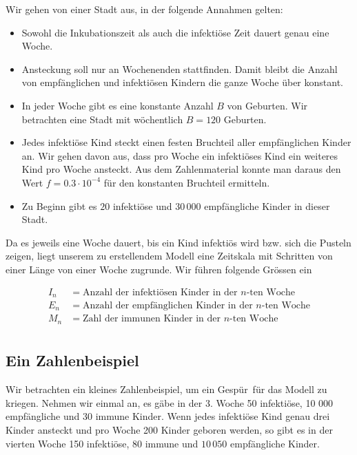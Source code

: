 \documentclass[%
11pt,%
twoside,%
titlepage,%
german,%
headsepline%
]{scrartcl}
\begin{document}
Wir gehen von einer Stadt aus, in der folgende Annahmen gelten:

\begin{itemize}
\item Sowohl die Inkubationszeit als auch die infektiöse Zeit dauert genau eine Woche.
\item Ansteckung soll nur an Wochenenden stattfinden. Damit bleibt die Anzahl von empfänglichen und infektiösen Kindern die ganze Woche über konstant.
\item In jeder Woche gibt es eine konstante Anzahl $B$ von Geburten. Wir betrachten eine Stadt mit wöchentlich $B=120$ Geburten.
\item Jedes infektiöse Kind steckt einen festen Bruchteil aller empfänglichen Kinder an. Wir gehen davon aus, dass pro Woche ein infektiöses Kind ein weiteres Kind pro Woche ansteckt. Aus dem Zahlenmaterial konnte man daraus den Wert $f=0.3\cdot10^{-4}$ für den konstanten Bruchteil ermitteln.
\item Zu Beginn gibt es $20$ infektiöse und $30\,000$ empfängliche Kinder in dieser
Stadt.
\end{itemize}

Da es jeweils eine Woche dauert, bis ein Kind infektiös wird bzw. sich die Pusteln zeigen, liegt unserem zu erstellendem Modell eine Zeitskala mit Schritten von einer Länge von einer Woche zugrunde. Wir führen folgende Grössen ein

\begin{align*}
I_n &= \text{Anzahl der infektiösen Kinder in der $n$-ten Woche}\\
E_n &= \text{Anzahl der empfänglichen Kinder in der $n$-ten Woche}\\
M_n &= \text{Zahl der immunen Kinder in der $n$-ten Woche}\\
\end{align*}

\subsection*{Ein Zahlenbeispiel}

Wir betrachten ein kleines Zahlenbeispiel, um ein \glqq Gespür\grqq\ für das Modell zu kriegen. Nehmen wir einmal an, es gäbe in der 3. Woche 50 infektiöse, 10 000 empfängliche und 30 immune Kinder. Wenn jedes infektiöse Kind genau drei Kinder ansteckt und pro Woche 200 Kinder geboren werden, so gibt es in der vierten Woche 150 infektiöse, 80 immune und $10\,050$ empfängliche Kinder.
\end{document}
